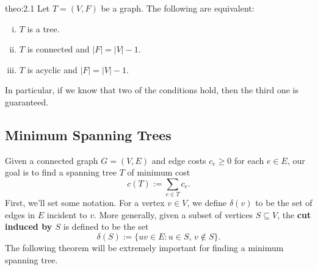 \begin{theo}{theo:2.1}
    Let $T = (V, F)$ be a graph. The following are equivalent:
    \begin{enumerate}[(i)]
        \item $T$ is a tree. 
        \item $T$ is connected and $|F| = |V| - 1$. 
        \item $T$ is acyclic and $|F| = |V| - 1$. 
    \end{enumerate}
\end{theo}

In particular, if we know that two of the conditions hold, then the 
third one is guaranteed.

\subsection{Minimum Spanning Trees}\label{subsec:2.2}
Given a connected graph $G = (V, E)$ and edge costs $c_e \geq 0$ for each 
$e \in E$, our goal is to find a spanning tree $T$ of minimum cost 
\[ c(T) := \sum_{e \in T} c_e. \] 
First, we'll set some notation. For a vertex $v \in V$, we define 
$\delta(v)$ to be the set of edges in $E$ incident to $v$. More generally, 
given a subset of vertices $S \subseteq V$, the {\bf cut induced by $S$} is 
defined to be the set 
\[ \delta(S) := \{uv \in E : u \in S,\, v \notin S\}. \] 
The following theorem will be extremely important for finding a minimum 
spanning tree. 

